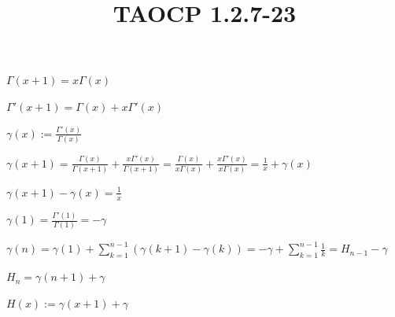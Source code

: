 \documentclass{article}
\title{TAOCP 1.2.7\mbox{-}23}
\begin{document}
\maketitle

\( \Gamma(x+1) = x \Gamma(x) \)

\( \Gamma'(x+1) = \Gamma(x) + x\Gamma'(x) \)

\( \gamma(x) := \frac{\Gamma'(x)}{\Gamma(x)} \)

\( \gamma(x+1) = \frac{\Gamma(x)}{\Gamma(x+1)} + \frac{x\Gamma'(x)}{\Gamma(x+1)} = \frac{\Gamma(x)}{x\Gamma(x)} + \frac{x\Gamma'(x)}{x\Gamma(x)} = \frac{1}{x} + \gamma(x) \)

\( \gamma(x + 1) - \gamma(x) = \frac{1}{x} \)

\( \gamma(1) = \frac{\Gamma'(1)}{\Gamma(1)} = -\gamma \)

\( \gamma(n) = \gamma(1) + \sum_{k=1}^{n-1} (\gamma(k+1) - \gamma(k)) = -\gamma + \sum_{k=1}^{n-1} \frac{1}{k} = H_{n-1} - \gamma \)

\( H_{n} = \gamma(n+1) + \gamma \)

\( H(x) := \gamma(x+1) + \gamma \)
\end{document}
